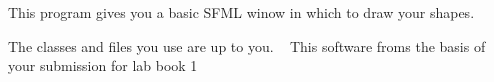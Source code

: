 This program gives you a basic S\+F\+ML winow in which to draw your shapes.

The classes and files you use are up to you. ~\newline
 This software froms the basis of your submission for lab book 1 